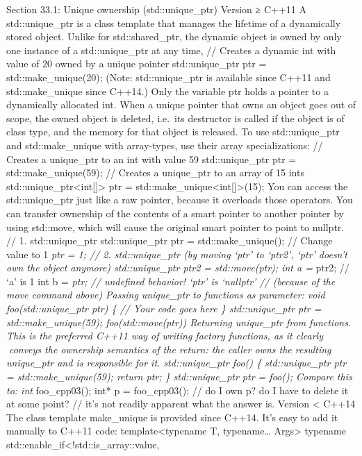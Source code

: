 Section 33.1: Unique ownership (std::unique\_ptr) Version ≥ C++11 A
std::unique\_ptr is a class template that manages the lifetime of a
dynamically stored object. Unlike for std::shared\_ptr, the dynamic
object is owned by only one instance of a std::unique\_ptr at any time,
// Creates a dynamic int with value of 20 owned by a unique pointer
std::unique\_ptr ptr = std::make\_unique(20); (Note: std::unique\_ptr is
available since C++11 and std::make\_unique since C++14.) Only the
variable ptr holds a pointer to a dynamically allocated int. When a
unique pointer that owns an object goes out of scope, the owned object
is deleted, i.e.~its destructor is called if the object is of class
type, and the memory for that object is released. To use
std::unique\_ptr and std::make\_unique with array-types, use their array
specializations: // Creates a unique\_ptr to an int with value 59
std::unique\_ptr ptr = std::make\_unique(59); // Creates a unique\_ptr
to an array of 15 ints std::unique\_ptr\textless int{[}{]}\textgreater{}
ptr = std::make\_unique\textless int{[}{]}\textgreater(15); You can
access the std::unique\_ptr just like a raw pointer, because it
overloads those operators. You can transfer ownership of the contents of
a smart pointer to another pointer by using std::move, which will cause
the original smart pointer to point to nullptr. // 1. std::unique\_ptr
std::unique\_ptr ptr = std::make\_unique(); // Change value to 1
\emph{ptr = 1; // 2. std::unique\_ptr (by moving `ptr' to `ptr2', `ptr'
doesn't own the object anymore) std::unique\_ptr ptr2 = std::move(ptr);
int a = }ptr2; // `a' is 1 int b = \emph{ptr; // undefined behavior!
`ptr' is `nullptr' // (because of the move command above) Passing
unique\_ptr to functions as parameter: void foo(std::unique\_ptr ptr) \{
// Your code goes here \} std::unique\_ptr ptr = std::make\_unique(59);
foo(std::move(ptr)) Returning unique\_ptr from functions. This is the
preferred C++11 way of writing factory functions, as it clearly conveys
the ownership semantics of the return: the caller owns the resulting
unique\_ptr and is responsible for it. std::unique\_ptr foo() \{
std::unique\_ptr ptr = std::make\_unique(59); return ptr; \}
std::unique\_ptr ptr = foo(); Compare this to: int} foo\_cpp03(); int* p
= foo\_cpp03(); // do I own p? do I have to delete it at some point? //
it's not readily apparent what the answer is. Version \textless{} C++14
The class template make\_unique is provided since C++14. It's easy to
add it manually to C++11 code: template\textless typename T,
typename\ldots{} Args\textgreater{} typename
std::enable\_if\textless!std::is\_array::value,
